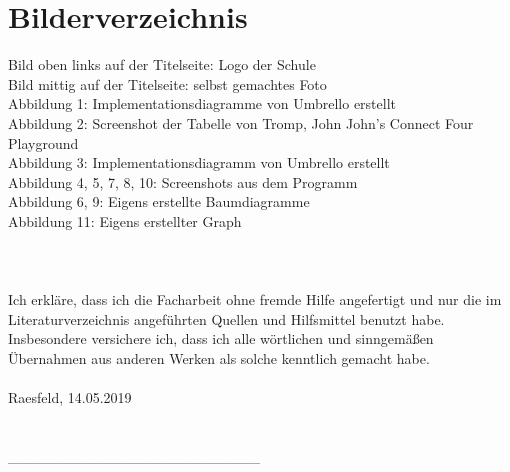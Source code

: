 \documentclass[12pt,a4paper]{article}
\begin{document}
	\section{Bilderverzeichnis}
	Bild oben links auf der Titelseite: Logo der Schule\\
	Bild mittig auf der Titelseite: selbst gemachtes Foto\\
	Abbildung 1: Implementationsdiagramme von \glqq Umbrello\grqq{} erstellt\\
	Abbildung 2: Screenshot der Tabelle von  Tromp, John  \glqq John's Connect Four Playground \grqq{}\\
	Abbildung 3: Implementationsdiagramm von \glqq Umbrello\grqq{} erstellt\\
	Abbildung 4, 5, 7, 8, 10: Screenshots aus dem Programm\\
	Abbildung 6, 9: Eigens erstellte Baumdiagramme\\
	Abbildung 11: Eigens erstellter Graph\\
	\\\\\\
	Ich erkläre, dass ich die Facharbeit ohne fremde Hilfe angefertigt und nur die
	im Literaturverzeichnis angeführten Quellen und Hilfsmittel benutzt habe.
	Insbesondere versichere ich, dass ich alle wörtlichen und sinngemäßen
	Übernahmen aus anderen Werken als solche kenntlich gemacht habe.
	\\\\
	Raesfeld, 14.05.2019
	\\\\\\
	\_\_\_\_\_\_\_\_\_\_\_\_\_\_\_\_\_\_\_\_\_\_\_\_
\end{document}
